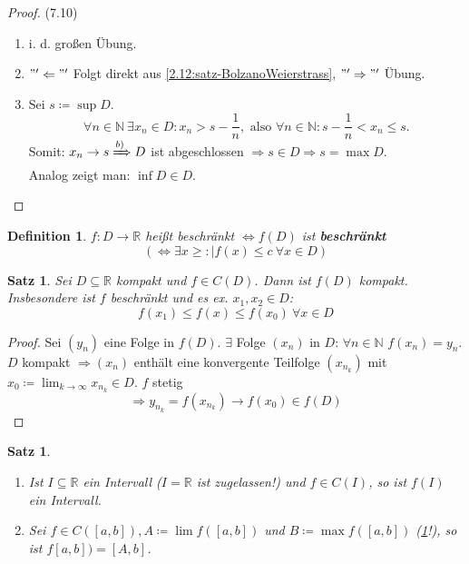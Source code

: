 \documentclass{extreport}
\newcommand{\N}{\mathbb{N}}
\newcommand{\R}{\mathbb{R}}
\theoremstyle{named}
\theoremstyle{dotless}
\newtheorem{satz}[namedtheorem]{Satz}
\newtheorem*{definition}{Definition}
\begin{document}
\begin{proof}(7.10) \\
	\begin{enumerate}
		\item i. d. gro{\ss}en Übung.
		\item $"'\Leftarrow"'$ Folgt direkt aus \ref{2.12:satz-BolzanoWeierstrass}, $"'\Rightarrow"'$ Übung.
		\item Sei $s \coloneqq \sup D$. 
			$$ \forall n \in \N ~\exists x_{n} \in D: x_{n} > s - \frac{1}{n}, \text{ also } \forall n \in \N: s - \frac{1}{n} < x_{n} \leq s. $$
			 Somit: $x_{n} \rightarrow s \xRightarrow[]{b)} D$ ist abgeschlossen $\Rightarrow s \in D \Rightarrow s = \max D$. \\
			 Analog zeigt man: $\inf D \in D$.
	\end{enumerate}	
\end{proof}

\begin{definition}
	$f \colon D \rightarrow \R$ hei{\ss}t beschränkt $\iff f(D)$ ist \textbf{beschränkt} $$ (\iff \exists x \geq : |f(x) \leq c ~\forall x \in D) $$
\end{definition}


\begin{satz} \label{7.11:satz}
	Sei $D \subseteq \R$ kompakt und $f \in C(D)$. Dann ist $f(D)$ kompakt. Insbesondere ist $f$ beschränkt	und es ex. $x_{1}, x_{2} \in D$: 
		$$ f(x_{1}) \leq f(x) \leq f(x_{0}) ~\forall x \in D $$
\end{satz}

\begin{proof}
	Sei $(y_{n})$ eine Folge in $f(D)$. $\exists$ Folge $(x_{n})$ in $D$: $\forall n \in \N$ $f(x_{n}) = y_{n}$. $D$ kompakt $\Rightarrow (x_{n})$ enthält eine konvergente Teilfolge $(x_{n_{k}})$ mit $x_{0} \coloneqq \lim_{k \rightarrow \infty} x_{n_{k}} \in D$. $f$ stetig 
	$$ \Rightarrow y_{n_{k}} = f(x_{n_{k}}) \rightarrow f(x_{0}) \in f(D) $$
\end{proof}


\begin{satz} ~\ \label{7.12:satz}
	\begin{enumerate}
		\item Ist $I \subseteq \R$ ein Intervall ($I = \R$ ist zugelassen!) und $f \in C(I)$, so ist $f(I)$ ein Intervall.
		\item Sei $f \in C([a, b]), A \coloneqq \lim f([a, b])$ und $B \coloneqq \max f([a, b])$ (\ref{7.11:satz}!), so ist $f[a, b]) = [A, b]$.
	\end{enumerate}
\end{satz}
\end{document}
